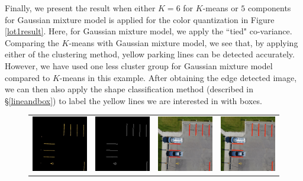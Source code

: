 \documentclass{m2pi}
\begin{document}
Finally, we present the result when either $ K=  6$ for $K$-means or
$5$ components for Gaussian mixture model is applied for the color 
quantization in Figure \ref{lot1result}. Here, for Gaussian mixture 
model,  we apply the ``tied" co-variance. 
Comparing the $K$-means with Gaussian mixture model, we see that, by applying 
either of the clustering method, yellow parking lines 
can be detected accurately. However, we have used one less
cluster group for Gaussian mixture model compared to $K$-means
in this example. 
After obtaining the edge detected image, we can then also apply 
the shape classification method (described in \S \ref{lineandbox}) to label
the yellow lines we are interested in with boxes. 


\begin{figure}[htp]
\centering
\begin{tabular}{cccc}
\includegraphics[width=3.5cm]{figures/Masked_Lot1.jpg}&
\includegraphics[width=3.5cm]{figures/Edge_Lot1.jpg}&
\includegraphics[width=3.5cm]{figures/Detected_Lot1.jpg}&
\includegraphics[width=3.5cm]{figures/Boxed_line_Lot1.jpg}\\

\end{tabular}
\end{figure}
\end{document}
